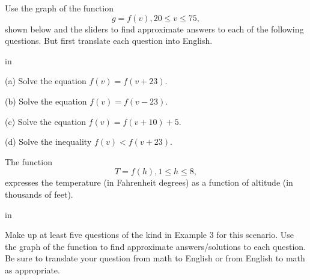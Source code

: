 \documentclass{ximera}
\newcommand{\pskip}{\vskip 0.1 in}
\begin{document}
\begin{example} \label{Ex:Fun4}

Use the graph of the function 
\[
    g = f(v) , 20\leq v \leq 75 ,
\]
shown below and the sliders to find approximate answers to each of the following questions. But first translate each question into English.
\begin{exploration}\label{exp:Fun4}

\pskip

(a) Solve the equation $f(v) = f(v+23)$.

(b) Solve the equation $f(v) = f(v-23)$.

(c) Solve the equation $f(v) = f(v+10) + 5$.

(d) Solve the inequality $f(v) < f(v+23)$.


 
\begin{onlineOnly}
    \begin{center}
\end{center}
\end{onlineOnly}
\end{exploration}

\end{example}





\begin{example} \label{Ex:Fun5}
The function
\[
   T = f(h) , 1\leq h \leq 8,
\]
expresses the temperature (in Fahrenheit degrees) as a function of altitude (in thousands of feet). 

\pskip

Make up at least five questions of the kind in Example 3 for this scenario. Use the graph of the function to find approximate answers/solutions to each question. Be sure to translate your question from math to English or from English to math as appropriate.

\begin{exploration}\label{exp:Fun5}


 
\begin{onlineOnly}
    \begin{center}
\end{center}
\end{onlineOnly}
\end{exploration}

\end{example}
\end{document}
